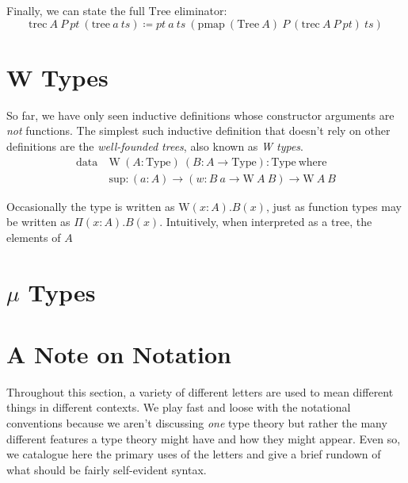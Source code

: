 \documentclass{report}
\newcommand{\Tree}{\const{Tree}}
\newcommand{\tree}{\const{tree}}
\newcommand{\W}{\const{W}}
\newcommand{\const}[1]{\text{#1}}
\newcommand{\data}{\const{data}}
\newcommand{\Type}{\const{Type}}
\newcommand{\where}{\const{where}}
\begin{document}
Finally, we can state the full $\Tree$ eliminator:
%
\begin{displaymath}
    \const{trec} ~ A ~ P ~ pt ~ (\tree ~ a ~ ts) \coloneqq pt ~ a ~ ts ~ (\const{pmap} ~ (\Tree ~ A) ~ P ~ (\const{trec} ~ A ~ P ~ pt) ~ ts)
\end{displaymath}

\section{W Types}

So far, we have only seen inductive definitions whose constructor arguments are \emph{not} functions. The simplest such inductive definition that doesn't rely on other definitions are the \emph{well-founded trees}, also known as \emph{W types}.
%
\begin{align*}
    \data ~ &\W ~ (A : \Type) ~ (B: A \to \Type): \Type ~ \where \\
    &\const{sup}: (a: A) \to (w: B ~ a \to \W ~ A ~ B) \to \W ~ A ~ B
\end{align*}

Occasionally the type is written as $\W (x: A). B(x)$, just as function types may be written as $\Pi (x: A). B(x)$. Intuitively, when interpreted as a tree, the elements of $A$ %

\section{$\mu$ Types}

\section{A Note on Notation}

Throughout this section, a variety of different letters are used to mean different things in different contexts. We play fast and loose with the notational conventions because we aren't discussing \emph{one} type theory but rather the many different features a type theory might have and how they might appear. Even so, we catalogue here the primary uses of the letters and give a brief rundown of what should be fairly self-evident syntax.
\end{document}
